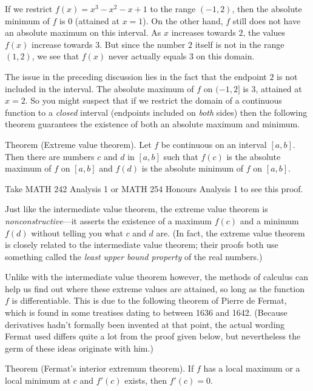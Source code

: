 If we restrict $f(x) = x^3 - x^2 - x + 1$ to the range $(-1, 2)$, then the absolute minimum
of $f$ is $0$ (attained at $x=1$). On the other hand, $f$ still does not have an absolute maximum
on this interval. As $x$ increases towards $2$, the values $f(x)$ increase towards $3$. But since the number
$2$ itself is not in the range $(1,2)$, we see that $f(x)$ never actually equals $3$ on this domain.

The issue in the preceding discussion lies in the fact that the endpoint $2$ is not included in the interval.
The absolute maximum of $f$ on $(-1,2]$ is $3$, attained at $x=2$. So you might suspect that
if we restrict the domain of a continuous function to a {\it closed} interval (endpoints included on {\it both}
sides)
then the following theorem guarantees the existence of both an absolute maximum
and minimum.

\parenproclaim Theorem {\advthm} (Extreme value theorem). Let $f$ be continuous on an interval
$[a,b]$. Then there are numbers $c$ and $d$ in $[a,b]$ such that $f(c)$ is the absolute maximum
of $f$ on $[a,b]$ and $f(d)$ is the absolute minimum of $f$ on $[a,b]$.

\proof Take {\mc MATH} 242 Analysis 1 or {\mc MATH 254} Honours Analysis 1 to see this proof.\slug

Just like the intermediate value theorem, the extreme value theorem is {\it nonconstructive}---it asserts
the existence of a maximum $f(c)$ and a minimum $f(d)$ without telling you what $c$ and $d$ are.
(In fact, the extreme value theorem is closely related to the intermediate value theorem; their proofs
both use something called the {\it least upper bound property} of the real numbers.)

Unlike with the intermediate value theorem however, the methods of calculus can help us find out where
these extreme values are attained, so long as the function $f$ is differentiable. This is due to the following
theorem of Pierre de Fermat, which is found in some treatises dating to between 1636 and 1642. (Because
derivatives hadn't formally been invented at that point, the actual wording Fermat used differs quite
a lot from the proof given below, but nevertheless the germ of these ideas originate with him.)

\edef\thmfermat{\the\thmcount}
\parenproclaim Theorem {\advthm} (Fermat's interior extremum theorem).
If $f$ has a local maximum or a local minimum at $c$ and $f'(c)$ exists, then $f'(c) = 0$.

